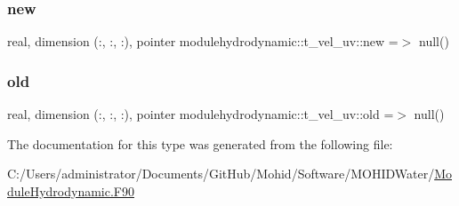 \mbox{\label{structmodulehydrodynamic_1_1t__vel__uv_a6bb9fcbf5b36a683dc10efa6def7653b}} 
\subsubsection{\texorpdfstring{new}{new}}
{\footnotesize\ttfamily real, dimension (\+:, \+:, \+:), pointer modulehydrodynamic\+::t\+\_\+vel\+\_\+uv\+::new =$>$ null()\hspace{0.3cm}{\ttfamily [private]}}

\mbox{\label{structmodulehydrodynamic_1_1t__vel__uv_a710cad52cdac9a7185ee3ef1ba7d5290}} 
\subsubsection{\texorpdfstring{old}{old}}
{\footnotesize\ttfamily real, dimension (\+:, \+:, \+:), pointer modulehydrodynamic\+::t\+\_\+vel\+\_\+uv\+::old =$>$ null()\hspace{0.3cm}{\ttfamily [private]}}



The documentation for this type was generated from the following file\+:\begin{DoxyCompactItemize}
\item 
C\+:/\+Users/administrator/\+Documents/\+Git\+Hub/\+Mohid/\+Software/\+M\+O\+H\+I\+D\+Water/\mbox{\hyperlink{_module_hydrodynamic_8_f90}{Module\+Hydrodynamic.\+F90}}\end{DoxyCompactItemize}
